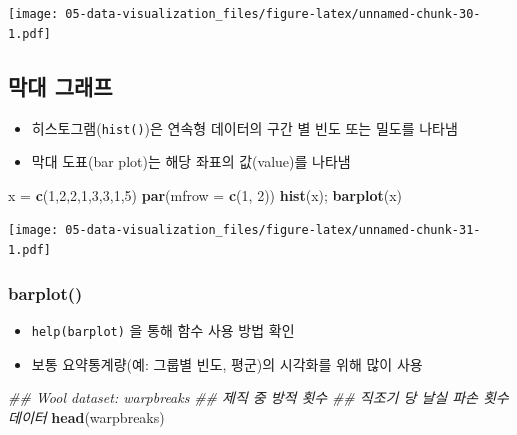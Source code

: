 \documentclass[
  11pt,
]{krantz}
\newenvironment{Shaded}{\begin{snugshade}}{\end{snugshade}}
\newcommand{\CommentTok}[1]{\textcolor[rgb]{0.37,0.37,0.37}{\textit{#1}}}
\newcommand{\DataTypeTok}[1]{\textcolor[rgb]{0.27,0.27,0.27}{#1}}
\newcommand{\DecValTok}[1]{\textcolor[rgb]{0.06,0.06,0.06}{#1}}
\newcommand{\KeywordTok}[1]{\textcolor[rgb]{0.27,0.27,0.27}{\textbf{#1}}}
\newcommand{\NormalTok}[1]{#1}
\newcommand{\StringTok}[1]{\textcolor[rgb]{0.5,0.5,0.5}{#1}}
\providecommand{\tightlist}{%
  \setlength{\itemsep}{0pt}\setlength{\parskip}{0pt}}
\begin{document}
\texttt{[image: 05-data-visualization\_files/figure-latex/unnamed-chunk-30-1.pdf]}

\normalsize

\hypertarget{bar-plot}{%
\subsection{막대 그래프}\label{bar-plot}}

\begin{itemize}
\tightlist
\item
  히스토그램(\texttt{hist()})은 연속형 데이터의 구간 별 빈도 또는 밀도를 나타냄
\item
  막대 도표(bar plot)는 해당 좌표의 값(value)를 나타냄
\end{itemize}

\footnotesize

\begin{Shaded}
\begin{Highlighting}[]
\NormalTok{x =}\StringTok{ }\KeywordTok{c}\NormalTok{(}\DecValTok{1}\NormalTok{,}\DecValTok{2}\NormalTok{,}\DecValTok{2}\NormalTok{,}\DecValTok{1}\NormalTok{,}\DecValTok{3}\NormalTok{,}\DecValTok{3}\NormalTok{,}\DecValTok{1}\NormalTok{,}\DecValTok{5}\NormalTok{)}
\KeywordTok{par}\NormalTok{(}\DataTypeTok{mfrow =} \KeywordTok{c}\NormalTok{(}\DecValTok{1}\NormalTok{, }\DecValTok{2}\NormalTok{))}
\KeywordTok{hist}\NormalTok{(x); }\KeywordTok{barplot}\NormalTok{(x)}
\end{Highlighting}
\end{Shaded}

\texttt{[image: 05-data-visualization\_files/figure-latex/unnamed-chunk-31-1.pdf]}

\normalsize

\hypertarget{barplot_fun}{%
\subsubsection*{\texorpdfstring{\textbf{barplot()}}{barplot()}}\label{barplot_fun}}


\begin{itemize}
\tightlist
\item
  \texttt{help(barplot)} 을 통해 함수 사용 방법 확인
\item
  보통 요약통계량(예: 그룹별 빈도, 평군)의 시각화를 위해 많이 사용
\end{itemize}

\footnotesize

\begin{Shaded}
\begin{Highlighting}[]
\CommentTok{## Wool dataset: warpbreaks }
\CommentTok{## 제직 중 방적 횟수}
\CommentTok{## 직조기 당 날실 파손 횟수 데이터}
\KeywordTok{head}\NormalTok{(warpbreaks)}
\end{Highlighting}
\end{Shaded}
\end{document}
